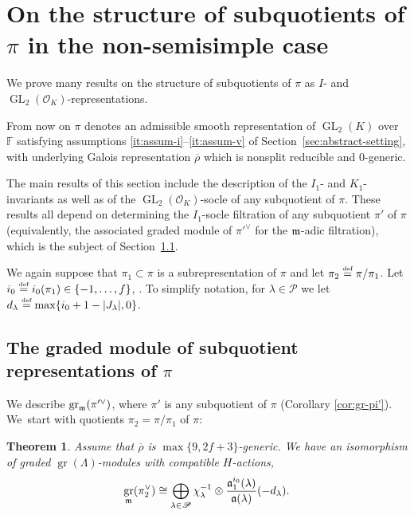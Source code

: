 \documentclass[JEP,XML,SOM,Unicode,NoFloatCountersInSection, NoEqCountersInSection,published]{cedram}
\newcommand{\defeq}{\stackrel{\textrm{\tiny{\upshape{def}}}}{=}}
\newcommand{\F}{\mathbb{F}}
\newcommand{\cO}{\mathcal{O}}
\renewcommand{\P}{\mathscr P}
\newcommand{\rhobar}{\overline{\rho}}
\newcommand{\brho}{\overline{\rho}}
\DeclareMathOperator{\GL}{GL}
\DeclareMathOperator{\gr}{gr}
\theoremstyle{plain}
\newtheorem{thm}[prop]{Theorem}
\theoremstyle{definition}
\begin{document}
\section{On the structure of subquotients of \texorpdfstring{$\pi$}{pi} in the non-semisimple case}
\label{sec:subquot-non-ss}

We prove many results on the structure of subquotients of $\pi$ as $I$- and $\GL_2(\cO_K)$-representations.

From now on $\pi$ denotes an admissible smooth representation of $\GL_2(K)$ over $\F$ satisfying assumptions \eqref{it:assum-i}--\eqref{it:assum-v} of Section~\ref{sec:abstract-setting}, with underlying Galois representation $\rhobar$ which is nonsplit reducible and {0}-generic.

The main results of this section include the description of the $I_1$- and $K_1$-invariants as well as of the $\GL_2(\cO_K)$-socle of any subquotient of $\pi$.
These results all depend on determining the $I_1$-socle filtration of any subquotient $\pi'$ of $\pi$ (equivalently, the associated graded module of $\pi'^\vee$ for the $\mathfrak{m}$-adic filtration), which is the subject of Section~\ref{sec:grad-module-subq}.

We again suppose that $\pi_1 \subset \pi$ is a subrepresentation of $\pi$ and let $\pi_2\defeq \pi/\pi_1$.
Let $i_0 \defeq i_0(\pi_1) \in \{-1,\dots,f\}$, \cf \cite[Th.\,4.3.15]{BHHMS4}.
To simplify notation, for $\lambda \in \P$ we let $d_\lambda \defeq \max\{i_0+1-|J_\lambda|,0\}$.

\subsection{The graded module of subquotient representations of \texorpdfstring{$\pi$}{pi}}
\label{sec:grad-module-subq}

We describe $\gr_\m(\pi'^\vee)$, where $\pi'$ is any subquotient of $\pi$ (Corollary \ref{cor:gr-pi'}). We~start with quotients $\pi_2 = \pi/\pi_1$ of $\pi$:

\begin{thm}\label{thm:gr-pi2}
Assume that $\brho$ is $\max\{9,2f+3\}$-generic. We have an isomorphism of graded $\gr(\Lambda)$-modules with compatible $H$-actions,
\begin{equation}\label{eq:gr-pi2}
\gr_\m(\pi_2^\vee) \cong \bigoplus_{\lambda \in \P} \chi_\lambda^{-1} \otimes \frac{\mathfrak{a}_1^{i_0}(\lambda)}{\mathfrak{a}(\lambda)}(-d_\lambda).
\end{equation}
\end{thm}
\end{document}

